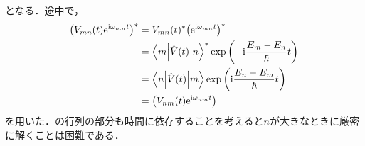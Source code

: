 \documentclass{report}
\begin{document}
  となる．途中で，
  \begin{align}
    \qty(V_{mn}(t)\mathrm{e}^{\mathrm{i}\omega_{mn}t})^* &= V_{mn}(t)^* \qty(\mathrm{e}^{\mathrm{i}\omega_{mn}t})^* \\ 
    &= \mel**{m}{\hat{V}(t)}{n}^*\exp\qty(-\mathrm{i}\frac{E_m - E_n}{\hbar}t) \\ 
    &= \mel**{n}{\hat{V}(t)}{m}\exp\qty(\mathrm{i}\frac{E_n - E_m}{\hbar}t) \\ 
    &= \qty(V_{nm}(t)\mathrm{e}^{\mathrm{i}\omega_{nm}t})
  \end{align}
  を用いた．の行列の部分も時間に依存することを考えると$n$が大きなときに厳密に解くことは困難である．
\end{document}
